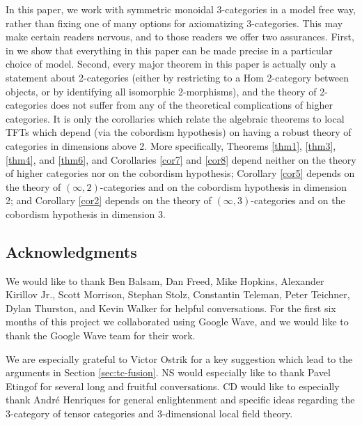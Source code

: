 \documentclass{amsart}
\begin{document}
In this paper, we work with symmetric monoidal 3-categories in a model free way, rather than fixing one of many options for axiomatizing 3-categories.  This may make certain readers nervous, and to those readers we offer two assurances.  First, in \cite{3TC} we show that everything in this paper can be made precise in a particular choice of model.  Second, every major theorem in this paper is actually only a statement about 2-categories (either by restricting to a Hom 2-category between objects, or by identifying all isomorphic 2-morphisms), and the theory of 2-categories does not suffer from any of the theoretical complications of higher categories.  It is only the corollaries which relate the algebraic theorems to local TFTs which depend (via the cobordism hypothesis) on having a robust theory of categories in dimensions above 2.  More specifically, Theorems \ref{thm1}, \ref{thm3}, \ref{thm4}, and \ref{thm6}, and Corollaries \ref{cor7} and \ref{cor8} depend neither
on the theory of higher categories nor on the cobordism hypothesis;
Corollary \ref{cor5} depends on the theory of $(\infty,2)$-categories and on the
cobordism hypothesis in dimension 2; and Corollary \ref{cor2} depends on the theory
of $(\infty,3)$-categories and on the cobordism hypothesis in dimension
3.  

\subsection*{Acknowledgments}

We would like to thank Ben Balsam, Dan Freed, Mike Hopkins, Alexander Kirillov Jr., Scott Morrison, Stephan Stolz, Constantin Teleman, Peter Teichner, Dylan Thurston, and Kevin Walker for helpful conversations.   For the first six months of this project we collaborated using Google Wave, and we would like to thank the Google Wave team for their work.  

We are especially grateful to Victor Ostrik for a key suggestion which lead to the arguments in Section \ref{sec:tc-fusion}.
NS would especially like to thank Pavel Etingof for several long and fruitful conversations.  CD would like to especially thank Andr\'e Henriques for general enlightenment and specific ideas regarding the 3-category of tensor categories and 3-dimensional local field theory.
\end{document}
